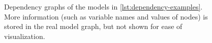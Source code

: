 \begin{figure}[t]
  \centering
  \caption{Dependency graphs of the models in \ref{lst:dependency-examples}.  More information (such
    as variable names and values of nodes) is stored in the real model graph, but not shown for ease
    of visualization.}
  \label{fig:geom-deps}
\end{figure}

